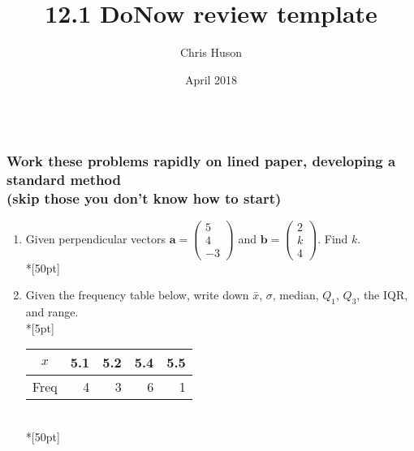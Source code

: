 \documentclass[12pt, oneside]{article}
\title{12.1 DoNow review template}
\author{Chris Huson}
\date{April 2018}
\begin{document}
\subsubsection*{\\ \textnormal{Work these problems rapidly on lined paper, developing a standard method \\(skip those you don't know how to start)}}

\begin{enumerate}
\item Given perpendicular vectors $\mathbf{a}= \begin{pmatrix} 5 \\ 4\\ -3 \end{pmatrix}$ and $\mathbf{b}= \begin{pmatrix} 2 \\ k \\ 4 \end{pmatrix}$. Find $k$.\\*[50pt]

\item Given the frequency table below, write down $\bar{x}$, $\sigma$, median, $Q_1$, $Q_3$, the IQR, and range.\\*[5pt]
\begin{tabular}{|c|r|r|r|r|}
\hline 
$x$ & 5.1 & 5.2 & 5.4 & 5.5\\ 
\hline 
Freq & 4 & 3 & 6 & 1  \\ 
\hline 
\end{tabular}\\*[50pt]


\end{enumerate}
\end{document}
